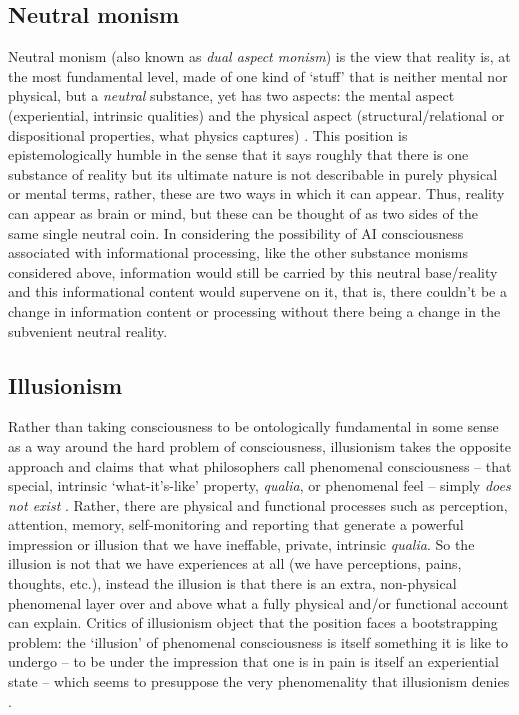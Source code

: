 \documentclass[11pt, a4paper, onecolumn, gdm]{google}
\begin{document}
\subsection{Neutral monism}\label{neutral-monism}

Neutral monism (also known as \emph{dual aspect monism}) is the view that reality is, at the most fundamental level, made of one kind of `stuff' that is neither mental nor physical, but a \emph{neutral} substance, yet has two aspects: the mental aspect (experiential, intrinsic qualities) and the physical aspect (structural/relational or dispositional properties, what physics captures) \citep{russell1927}.
This position is epistemologically humble in the sense that it says roughly that there is one substance of reality but its ultimate nature is not describable in purely physical or mental terms, rather, these are two ways in which it can appear.
Thus, reality can appear as brain or mind, but these can be thought of as two sides of the same single neutral coin.
In considering the possibility of AI consciousness associated with informational processing, like the other substance monisms considered above, information would still be carried by this neutral base/reality and this informational content would supervene on it, that is, there couldn't be a change in information content or processing without there being a change in the subvenient neutral reality.

\subsection{Illusionism}\label{illusionism}

Rather than taking consciousness to be ontologically fundamental in some sense as a way around the hard problem of consciousness, illusionism takes the opposite approach and claims that what philosophers call phenomenal consciousness -- that special, intrinsic `what-it's-like' property, \emph{qualia}, or phenomenal feel -- simply \emph{does not exist} \citep{frankish2016}.
Rather, there are physical and functional processes such as perception, attention, memory, self-monitoring and reporting that generate a powerful impression or illusion that we have ineffable, private, intrinsic \emph{qualia}.
So the illusion is not that we have experiences at all (we have perceptions, pains, thoughts, etc.), instead the illusion is that there is an extra, non-physical phenomenal layer over and above what a fully physical and/or functional account can explain.
Critics of illusionism object that the position faces a bootstrapping problem: the `illusion' of phenomenal consciousness is itself something it is like to undergo -- to be under the impression that one is in pain is itself an experiential state -- which seems to presuppose the very phenomenality that illusionism denies \citep{chalmers2018}.
\end{document}
